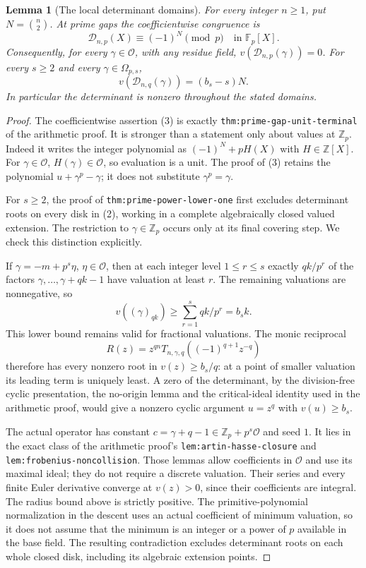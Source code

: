 \documentclass[11pt]{article}
\newtheorem{lemma}{Lemma}
\newcommand{\Zp}{\mathbb Z_p}
\newcommand{\OO}{\mathcal O}
\begin{document}
\begin{lemma}[The local determinant domains]\label{lem:local-domains}
For every integer $n\ge1$, put $N=\binom n2$.
At prime gaps the coefficientwise congruence is
\[
 \mathcal D_{n,p}(X)\equiv(-1)^N\pmod p
       \quad\text{in }\mathbb F_p[X].
 \tag{3}
\]
Consequently, for every $\gamma\in\OO$, with any residue field,
$v(\mathcal D_{n,p}(\gamma))=0$.
For every $s\ge2$ and every $\gamma\in\Omega_{p,s}$,
\[
 v(\mathcal D_{n,q}(\gamma))=(b_s-s)N.
 \tag{4}
\]
In particular the determinant is nonzero throughout the stated domains.
\end{lemma}
\begin{proof}
The coefficientwise assertion (3) is exactly
\texttt{thm:prime-gap-unit-terminal} of the arithmetic proof.
It is stronger than a statement only about values at $\Zp$.
Indeed it writes the integer polynomial as
$(-1)^N+pH(X)$ with $H\in\mathbb Z[X]$.
For $\gamma\in\OO$, $H(\gamma)\in\OO$, so evaluation is a unit.
The proof of (3) retains the polynomial
$u+\gamma^p-\gamma$; it does not substitute $\gamma^p=\gamma$.

For $s\ge2$, the proof of
\texttt{thm:prime-power-lower-one} first excludes determinant roots
on every disk in (2), working in a complete algebraically closed valued
extension. The restriction to $\gamma\in\Zp$ occurs only at its final
covering step. We check this distinction explicitly.

If $\gamma=-m+p^s\eta$, $\eta\in\OO$, then at each integer level
$1\le r\le s$ exactly $qk/p^r$ of the factors
$\gamma,\ldots,\gamma+qk-1$ have valuation at least $r$.
The remaining valuations are nonnegative, so
\[
 v((\gamma)_{qk})\ge \sum_{r=1}^s qk/p^r=b_sk.
 \tag{5}
\]
This lower bound remains valid for fractional valuations.
The monic reciprocal
\[
 R(z)=z^{qn}T_{n,\gamma,q}((-1)^{q+1}z^{-q})
\]
therefore has every nonzero root in $v(z)\ge b_s/q$:
at a point of smaller valuation its leading term is uniquely least.
A zero of the determinant, by the division-free cyclic presentation,
the no-origin lemma and the critical-ideal identity used in the arithmetic
proof, would give a nonzero cyclic argument $u=z^q$ with $v(u)\ge b_s$.

The actual operator has constant
$c=\gamma+q-1\in\Zp+p^s\OO$ and seed $1$.
It lies in the exact class of the arithmetic proof's
\texttt{lem:artin-hasse-closure} and
\texttt{lem:frobenius-noncollision}.
Those lemmas allow coefficients in $\OO$ and use its maximal ideal;
they do not require a discrete valuation.
Their series and every finite Euler derivative converge at $v(z)>0$,
since their coefficients are integral. The radius bound above is strictly
positive. The primitive-polynomial normalization in the descent uses an
actual coefficient of minimum valuation, so it does not assume that
the minimum is an integer or a power of $p$ available in the base field.
The resulting contradiction excludes determinant roots on each whole
closed disk, including its algebraic extension points.


\end{proof}
\end{document}
